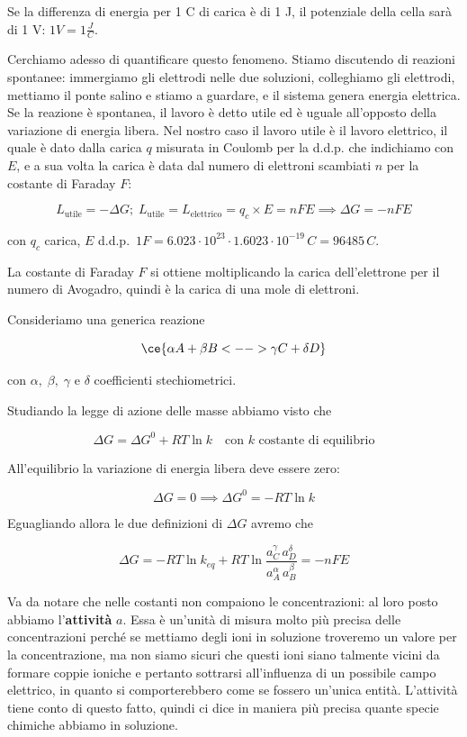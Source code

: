 Se la differenza di energia per 1 C di carica è di 1 J, il potenziale della cella sarà di 1 V: $1 V=1\frac{J}{C}$.

Cerchiamo adesso di quantificare questo fenomeno. Stiamo discutendo di reazioni spontanee: immergiamo gli elettrodi nelle due soluzioni, colleghiamo gli elettrodi, mettiamo il ponte salino e stiamo a guardare, e il sistema genera energia elettrica. Se la reazione è spontanea, il lavoro è detto utile ed è uguale all'opposto della variazione di energia libera. Nel nostro caso il lavoro utile è il lavoro elettrico, il quale è dato dalla carica $q$ misurata in Coulomb per la d.d.p. che indichiamo con $E$, e a sua volta la carica è data dal numero di elettroni scambiati $n$ per la costante di Faraday $F$:

$$L_{\text{utile}}=- \Delta G; \; L_{\text{utile}}=L_{\text{elettrico}}=q_c \times E=nFE \implies \Delta G = -nFE$$

con $q_c$ carica, $E$ d.d.p.\, $1F=6.023 \cdot 10^{23} \cdot 1.6023 \cdot 10^{-19} \, C = 96485 \, C$.

La costante di Faraday $F$ si ottiene moltiplicando la carica dell'elettrone per il numero di Avogadro, quindi è la carica di una mole di elettroni.

Consideriamo una generica reazione

$$\ce{\alpha A + \beta B <--> \gamma C + \delta D}$$

con $\alpha, \; \beta, \; \gamma$ e $\delta$ coefficienti stechiometrici.

Studiando la legge di azione delle masse abbiamo visto che

$$\Delta G = \Delta G^0 + RT\ln k \quad \text{con }k \text{ costante di equilibrio}$$

All'equilibrio la variazione di energia libera deve essere zero:

$$\Delta G=0 \implies \Delta G^0= -RT \ln k$$

Eguagliando allora le due definizioni di $\Delta G$ avremo che

$$\Delta G =  -RT \ln k_{eq} + RT \ln \frac{a_C^{\gamma} \, a_D^{\delta}}{a_A^{\alpha} \, a_B^{\beta}}=-nFE$$

Va da notare che nelle costanti non compaiono le concentrazioni: al loro posto abbiamo l'\textbf{attività} $a$. Essa è un'unità di misura molto più precisa delle concentrazioni perché se mettiamo degli ioni in soluzione troveremo un valore per la concentrazione, ma non siamo sicuri che questi ioni siano talmente vicini da formare coppie ioniche e pertanto sottrarsi all'influenza di un possibile campo elettrico, in quanto si comporterebbero come se fossero un'unica entità. L'attività tiene conto di questo fatto, quindi ci dice in maniera più precisa quante specie chimiche abbiamo in soluzione.

